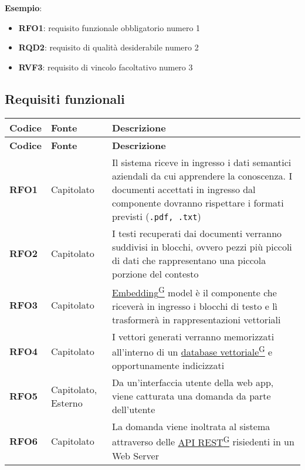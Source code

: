 \textbf{Esempio}:
\begin{itemize}
	\item \textbf{RFO1}: requisito funzionale obbligatorio numero 1
	\item \textbf{RQD2}: requisito di qualità desiderabile numero 2
	\item \textbf{RVF3}: requisito di vincolo facoltativo numero 3
\end{itemize}

\pagebreak
\subsection{Requisiti funzionali}
\begin{longtable}{|>{\centering\arraybackslash}m{}|>{\centering\arraybackslash}m{}|>{\arraybackslash}m{}|}
	\hline
	\textbf{Codice} & \textbf{Fonte} & \textbf{Descrizione}\\\hline
	\endfirsthead
	\hline
	\textbf{Codice} & \textbf{Fonte} & \textbf{Descrizione}\\\hline
	\endhead
	\hline
	\textbf{RFO1} & Capitolato & Il sistema riceve in ingresso i dati semantici aziendali da cui apprendere la conoscenza. I documenti accettati in ingresso dal componente dovranno rispettare i formati previsti (\texttt{.pdf, .txt}) \\
	\hline
	\textbf{RFO2} & Capitolato & I testi recuperati dai documenti verranno suddivisi in blocchi, ovvero pezzi più piccoli di dati che rappresentano una piccola porzione del contesto\\
	\hline
	\textbf{RFO3} & Capitolato & \href{https://code7crusaders.github.io/docs/RTB/documentazione_interna/glossario.html#embedding}{Embedding\textsuperscript{G}} model è il componente che riceverà in ingresso i blocchi di testo e lì trasformerà in rappresentazioni vettoriali\\
	\hline
	\textbf{RFO4} & Capitolato & I vettori generati verranno memorizzati all’interno di un \href{https://code7crusaders.github.io/docs/RTB/documentazione_interna/glossario.html#database-vettoriale}{database vettoriale\textsuperscript{G}} e opportunamente indicizzati\\
	\hline
	\textbf{RFO5} & Capitolato, Esterno & Da un’interfaccia utente della web app, viene catturata una domanda da parte dell’utente\\
	\hline
	\textbf{RFO6} & Capitolato & La domanda viene inoltrata al sistema attraverso delle \href{https://code7crusaders.github.io/docs/RTB/documentazione_interna/glossario.html#api-rest-representational-state-transfer}{API REST\textsuperscript{G}} risiedenti in un Web Server\\

\end{longtable}
